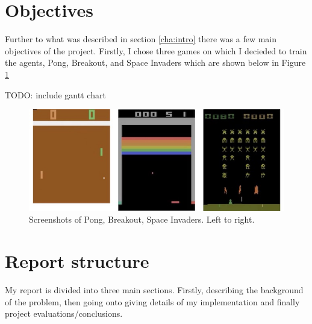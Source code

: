 \section{Objectives}
\label{intro:sec:obj}
Further to what was described in section \ref{cha:intro} there was a few main objectives of the project. Firstly, I chose three games on which I decieded to train the agents, Pong, Breakout, and Space Invaders which are shown below in Figure \ref{fig:atari-screenshot}

TODO: include gantt chart

\begin{figure}[htbp]
	\centering
	\includegraphics[scale=0.5]{chapters/chapter1/images/atari-combined.jpg}
	\caption{Screenshots of Pong, Breakout, Space Invaders. Left to right.
		\label{fig:atari-screenshot}
	}
\end{figure}

\section{Report structure}
\label{intro:sec:report_struc}

My report is divided into three main sections. Firstly, describing the background of the problem, then going onto giving details of my implementation and finally project evaluations/conclusions.